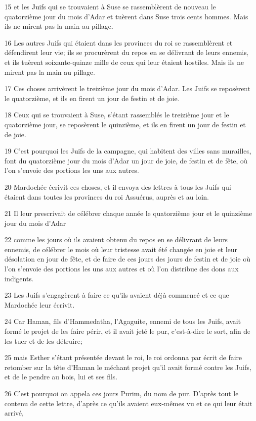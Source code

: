 \par 15 et les Juifs qui se trouvaient à Suse se rassemblèrent de nouveau le quatorzième jour du mois d'Adar et tuèrent dans Suse trois cents hommes. Mais ils ne mirent pas la main au pillage.
\par 16 Les autres Juifs qui étaient dans les provinces du roi se rassemblèrent et défendirent leur vie; ils se procurèrent du repos en se délivrant de leurs ennemis, et ils tuèrent soixante-quinze mille de ceux qui leur étaient hostiles. Mais ils ne mirent pas la main au pillage.
\par 17 Ces choses arrivèrent le treizième jour du mois d'Adar. Les Juifs se reposèrent le quatorzième, et ils en firent un jour de festin et de joie.
\par 18 Ceux qui se trouvaient à Suse, s'étant rassemblés le treizième jour et le quatorzième jour, se reposèrent le quinzième, et ils en firent un jour de festin et de joie.
\par 19 C'est pourquoi les Juifs de la campagne, qui habitent des villes sans murailles, font du quatorzième jour du mois d'Adar un jour de joie, de festin et de fête, où l'on s'envoie des portions les uns aux autres.
\par 20 Mardochée écrivit ces choses, et il envoya des lettres à tous les Juifs qui étaient dans toutes les provinces du roi Assuérus, auprès et au loin.
\par 21 Il leur prescrivait de célébrer chaque année le quatorzième jour et le quinzième jour du mois d'Adar
\par 22 comme les jours où ils avaient obtenu du repos en se délivrant de leurs ennemis, de célébrer le mois où leur tristesse avait été changée en joie et leur désolation en jour de fête, et de faire de ces jours des jours de festin et de joie où l'on s'envoie des portions les uns aux autres et où l'on distribue des dons aux indigents.
\par 23 Les Juifs s'engagèrent à faire ce qu'ils avaient déjà commencé et ce que Mardochée leur écrivit.
\par 24 Car Haman, fils d'Hammedatha, l'Agaguite, ennemi de tous les Juifs, avait formé le projet de les faire périr, et il avait jeté le pur, c'est-à-dire le sort, afin de les tuer et de les détruire;
\par 25 mais Esther s'étant présentée devant le roi, le roi ordonna par écrit de faire retomber sur la tête d'Haman le méchant projet qu'il avait formé contre les Juifs, et de le pendre au bois, lui et ses fils.
\par 26 C'est pourquoi on appela ces jours Purim, du nom de pur. D'après tout le contenu de cette lettre, d'après ce qu'ils avaient eux-mêmes vu et ce qui leur était arrivé,
